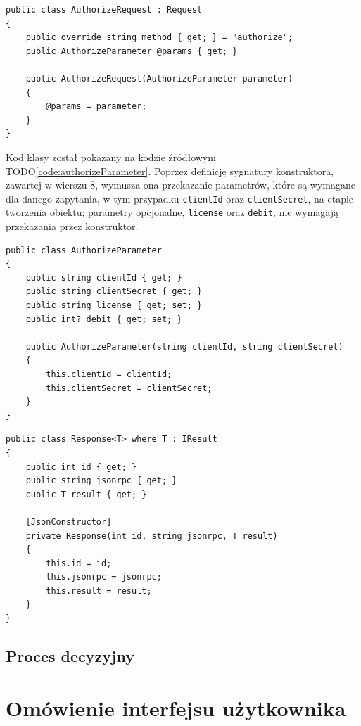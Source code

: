 \documentclass[skorowidz,skroty]{dyplomWEZUT}
\begin{document}
\begin{lstlisting}[language={[Sharp]C}]
public class AuthorizeRequest : Request
{
    public override string method { get; } = "authorize";
    public AuthorizeParameter @params { get; }

    public AuthorizeRequest(AuthorizeParameter parameter)
    {
        @params = parameter;
    }
}
\end{lstlisting}

Kod klasy  został pokazany na kodzie źródłowym TODO\ref{code:authorizeParameter}. Poprzez definicję sygnatury konstruktora, zawartej w wierszu 8, wymusza ona przekazanie parametrów, które są wymagane dla danego zapytania, w tym przypadku \lstinline[language={[Sharp]C}]{clientId} oraz \lstinline[language={[Sharp]C}]{clientSecret}, na etapie tworzenia obiektu; parametry opcjonalne, \lstinline[language={[Sharp]C}]{license} oraz \lstinline[language={[Sharp]C}]{debit}, nie wymagają przekazania przez konstruktor.

\begin{lstlisting}[language={[Sharp]C}]
public class AuthorizeParameter
{
    public string clientId { get; }
    public string clientSecret { get; }
    public string license { get; set; }
    public int? debit { get; set; }

    public AuthorizeParameter(string clientId, string clientSecret)
    {
        this.clientId = clientId;
        this.clientSecret = clientSecret;
    }
}
\end{lstlisting}


\begin{lstlisting}[language={[Sharp]C}]
public class Response<T> where T : IResult
{
    public int id { get; }
    public string jsonrpc { get; }
    public T result { get; }

    [JsonConstructor]
    private Response(int id, string jsonrpc, T result)
    {
        this.id = id;
        this.jsonrpc = jsonrpc;
        this.result = result;
    }
}
\end{lstlisting}


\subsection{Proces decyzyjny}
\section{Omówienie interfejsu użytkownika}
\end{document}
